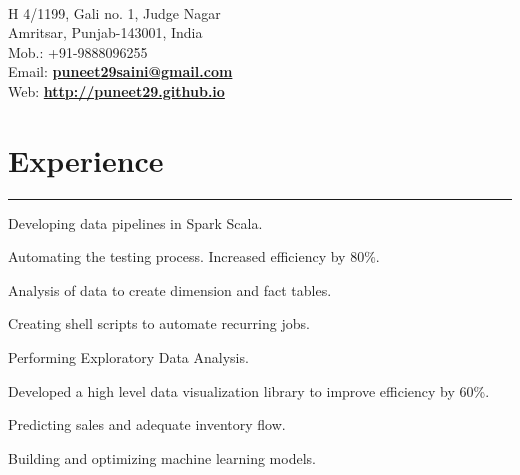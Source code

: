\documentclass[]{puneet-resume}
\begin{document}
\hfill
\begin{minipage}[t]{0.66\textwidth}
\hspace*{1pt}\hfill    \\
\hspace*{0pt}\hfill H 4/1199, Gali no. 1, Judge Nagar \\
\hspace*{0pt}\hfill Amritsar, Punjab-143001, India \\
\hspace*{0pt}\hfill Mob.: +91-9888096255 \\
\hspace*{0pt}\hfill Email: \textbf{\href{mailto:puneet29saini@gmail.com}{puneet29saini@gmail.com}} \\
\hspace*{0pt}\hfill Web: \textbf{\href{http://puneet29.github.io}{http://puneet29.github.io}} 
\section{Experience}
\noindent\rule{12.5cm}{0.4pt}
 
\noindent
\hspace{5em}%
\begin{tightemize}
\begin{minipage}{0.85\textwidth\vspace{2pt}}
	\item Developing data pipelines in Spark Scala.
	\item Automating the testing process. Increased efficiency by 80\%.
	\item Analysis of data to create dimension and fact tables.
	\item Creating shell scripts to automate recurring jobs.
\end{minipage}
\end{tightemize}
\sectionsep

 
\noindent
\hspace{5em}%
\begin{tightemize}
\begin{minipage}{0.85\textwidth\vspace{2pt}}
	\item Performing Exploratory Data Analysis.
	\item Developed a high level data visualization library to improve efficiency by 60\%.
	\item Predicting sales and adequate inventory flow.
	\item Building and optimizing machine learning models.
\end{minipage}
\end{tightemize}
\sectionsep


\end{minipage}
\end{document}
